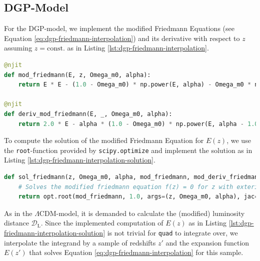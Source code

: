 \subsection{DGP-Model}

For the DGP-model, we implement the modified Friedmann Equations (see Equation \ref{eq:dgp-friedmann-interpolation}) and its derivative with respect to $z$ assuming $z = \text{const.}$ as in Listing \ref{lst:dgp-friedmann-interpolation}. 
\begin{lstlisting}[language=Python, caption={Function for modified Friedmann Equation and its derivative assuming $z = \text{const}$.}, label={lst:dgp-friedmann-interpolation}]
@njit
def mod_friedmann(E, z, Omega_m0, alpha):
    return E * E - (1.0 - Omega_m0) * np.power(E, alpha) - Omega_m0 * np.power(1.0 + z, 3)

@njit
def deriv_mod_friedmann(E, _, Omega_m0, alpha):
    return 2.0 * E - alpha * (1.0 - Omega_m0) * np.power(E, alpha - 1.0)
\end{lstlisting}

\noindent To compute the solution of the modified Friedmann Equation for $E(z)$, we use the \colorbox{backcolor}{\lstinline{root}}-function provided by \colorbox{backcolor}{\lstinline{scipy.optimize}} and implement the solution as in Listing \ref{lst:dgp-friedmann-interpolation-solution}.

\begin{lstlisting}[language=Python, caption={Function to find the solution of the modified Friedmann Equation.}, label={lst:dgp-friedmann-interpolation-solution}]
def sol_friedmann(z, Omega_m0, alpha, mod_friedmann, mod_deriv_friedmann):
    # Solves the modified friedmann equation f(z) = 0 for z with exterior derivative mod_deriv_friedmann
    return opt.root(mod_friedmann, 1.0, args=(z, Omega_m0, alpha), jac=mod_deriv_friedmann).x[0]
\end{lstlisting}

\noindent As in the $\Lambda$CDM-model, it is demanded to calculate the (modified) luminosity distance $\mathcal{D}_{\text{L}}$. Since the implemented computation of $E(z)$ as in Listing \ref{lst:dgp-friedmann-interpolation-solution} is not trivial for \colorbox{backcolor}{\lstinline{quad}} to integrate over, we interpolate the integrand by a sample of redshifts $z'$ and the expansion function $E(z')$ that solves Equation \ref{eq:dgp-friedmann-interpolation} for this sample.


